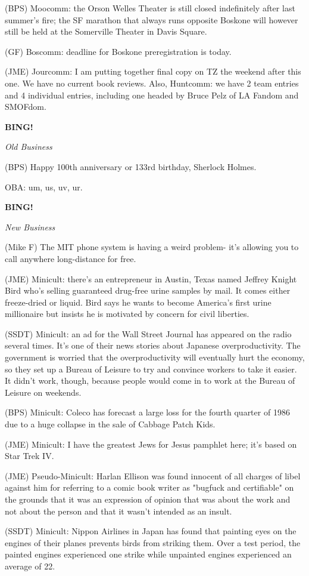 \documentclass[12pt]{article}
\newcommand{\bing}{{\bf BING!} }
\newcommand{\goto}[1]{\bing \vskip 12pt \centerline{{\em{#1}}}}
\begin{document}
(BPS) Moocomm: the Orson Welles Theater is still closed indefinitely after last summer's fire; the SF marathon that always runs opposite Boskone will however still be held at the Somerville Theater in Davis Square.

(GF) Boscomm: deadline for Boskone preregistration is today.

(JME) Jourcomm: I am putting together final copy on TZ the weekend after this one. We have no current book reviews. Also, Huntcomm: we have 2 team entries and 4 individual entries, including one headed by Bruce Pelz of LA Fandom and SMOFdom.

\goto{Old Business}

(BPS) Happy 100th anniversary or 133rd birthday, Sherlock Holmes.

OBA: um, us, uv, ur.

\goto{New Business}

(Mike F) The MIT phone system is having a weird problem- it's allowing you to call anywhere long-distance for free.

(JME) Minicult: there's an entrepreneur in Austin, Texas named Jeffrey Knight Bird who's selling guaranteed drug-free urine samples by mail. It comes either freeze-dried or liquid. Bird says he wants to become America's first urine millionaire but insists he is motivated by concern for civil liberties.

(SSDT) Minicult: an ad for the Wall Street Journal has appeared on the radio several times. It's one of their news stories about Japanese overproductivity. The government is worried that the overproductivity will eventually hurt the economy, so they set up a Bureau of Leisure to try and convince workers to take it easier. It didn't work, though, because people would come in to work at the Bureau of Leisure on weekends.

(BPS) Minicult: Coleco has forecast a large loss for the fourth quarter of 1986 due to a huge collapse in the sale of Cabbage Patch Kids.

(JME) Minicult: I have the greatest Jews for Jesus pamphlet here; it's based on Star Trek IV.

(JME) Pseudo-Minicult: Harlan Ellison was found innocent of all charges of libel against him for referring to a comic book writer as "bugfuck and certifiable" on the grounds that it was an expression of opinion that was about the work and not about the person and that it wasn't intended as an insult.

(SSDT) Minicult: Nippon Airlines in Japan has found that painting eyes on the engines of their planes prevents birds from striking them. Over a test period, the painted engines experienced one strike while unpainted engines experienced an average of 22.
\end{document}
